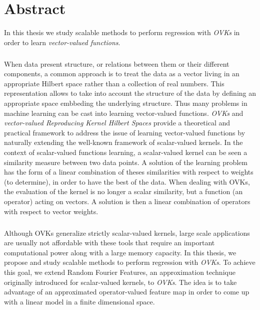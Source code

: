 



\begingroup
\let\clearpage\relax
\let\cleardoublepage\relax
\let\cleardoublepage\relax

\chapter*{Abstract}
In this thesis we study scalable methods to perform regression with
\emph{\acl{OVK}s} in order to learn \emph{vector-valued functions}.
\paragraph{}
When data present structure, or relations between them or their different
components, a common approach is to treat the data as a vector living in an
appropriate Hilbert space rather than a collection of real numbers. This
representation allows to take into account the structure of the data by
defining an appropriate space embbeding the underlying structure. Thus many
problems in machine learning can be cast into learning vector-valued functions.
\emph{\acl{OVK}s} and \emph{vector-valued Reproducing Kernel Hilbert Spaces}
provide a theoretical and practical framework to address the issue of learning
vector-valued functions by naturally extending the well-known framework of
scalar-valued kernels. In the context of scalar-valued functions learning, a
scalar-valued kernel can be seen a similarity measure between two data
points. A solution of the learning problem has the form of a linear combination
of theses similarities with respect to weights (to determine), in order to have
the best  of the data. When dealing with \acl{OVK}s, the evaluation of
the kernel is no longer a scalar similarity, but a function (an operator)
acting on vectors. A solution is then a linear combination of operators with
respect to vector weights.
\paragraph{}
Although \acl{OVK}s generalize strictly scalar-valued kernels,
large scale applications are usually not affordable with these tools that
require an important computational power along with a large memory capacity. In
this thesis, we propose and study scalable methods to perform regression with
\emph{\acl{OVK}s}. To achieve this goal, we extend Random Fourier Features, an
approximation technique originally introduced for scalar-valued kernels, to
\emph{\acl{OVK}s}. The idea is to take advantage of an approximated
operator-valued feature map in order to come up with a linear model in a finite
dimensional space.
